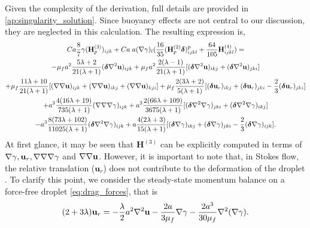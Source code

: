 Given the complexity of the derivation, full details are provided in \ref{ap:singularity_solution}. 
Since buoyancy effects are not central to our discussion, they are neglected in this calculation. 
The resulting expression is,
\begin{multline}
    \label{eq:defH3}
    Ca \frac{8}{7} \gamma (\textbf{H}_p^{(3)})_{ijk}
    +
    Ca \; a (\grad \gamma)_l(  \frac{16}{35} 
    (\textbf{H}_p^{(2)}\bm\delta)^\text{p}_{ijkl}
    +
    \frac{64}{105} \textbf{H}^{(4)}_{ijkl})
    =\\
    - \mu_f a^2 \frac{5\lambda+2}{21(\lambda+1)} (\bm\delta \grad^2 \textbf{u})_{ijk}
    + \mu_f a^2 \frac{2(\lambda-1)}{21(\lambda+1)} [
        (\bm\delta \grad^2 \textbf{u})_{ikj}
        + (\bm\delta \grad^2 \textbf{u})_{jki}
        ]  \\
    + \mu_f \frac{11\lambda+10}{21(\lambda+1)} [(\grad\grad \textbf{u})_{ijk}+(\grad\grad \textbf{u})_{ikj}+(\grad\grad \textbf{u})_{kji}] 
    + \mu_f\frac{2(3\lambda+2)}{5(\lambda+1)}[
        (\bm\delta \textbf{u}_r)_{ikj}
        +(\bm\delta \textbf{u}_r)_{jki}
        - \frac{2}{3}(\bm\delta \textbf{u}_r)_{jki}
        ] \\
    +a^3\frac{4(16\lambda + 19)}{735(\lambda +1)}(\grad\grad\grad \gamma)_{ijk}
    +a^3\frac{2(66\lambda + 109)}{3675(\lambda +1)}
    [
        (\bm\delta \grad^2\grad \gamma)_{jki}
        + (\bm\delta \grad^2\grad \gamma)_{ikj}
    ] \\
    - a^3 \frac{8(73\lambda+102)}{11025(\lambda +1)} 
    (\bm\delta \grad^2\grad \gamma)_{ijk}
    +a \frac{4(2\lambda +3)}{15(\lambda +1)}  
    [
        (\bm\delta\grad \gamma)_{ikj}
        + (\bm\delta\grad \gamma)_{jki}
        - \frac{2}{3}(\bm\delta\grad \gamma)_{ijk}
    ].
\end{multline}
At first glance, it may be seen that $\textbf{H}^{(3)}$ can be explicitly computed in terms of $\mathbf{\nabla}\gamma, \textbf{u}_r, \mathbf{\nabla}\mathbf{\nabla}\mathbf{\nabla}\gamma$ and $\mathbf{\nabla} \mathbf{\nabla} \textbf{u}$. 
However, it is important to note that, in Stokes flow, the relative translation ($\textbf{u}_r$) does not contribute to the deformation of the droplet \citep{taylor1964deformation,nadim1991motion}. 
To clarify this point, we consider the steady-state momentum balance on a force-free droplet \eqref{eq:drag_forces}, that is 
\begin{equation}
    (2+3\lambda)\textbf{u}_r
    = 
    -\frac{\lambda}{2} a^2\mathbf{\nabla}^2 \textbf{u}
    -\frac{2a}{3 \mu_f } \mathbf{\nabla} \gamma
    -\frac{2 a^3}{30\mu_f }\mathbf{\nabla}^2(\mathbf{\nabla}\gamma).
\end{equation} 
